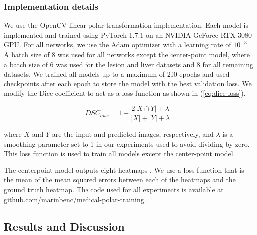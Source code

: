     \subsubsection{Implementation details}

We use the OpenCV linear polar transformation implementation.
Each model is implemented and trained using PyTorch 1.7.1 on an NVIDIA GeForce RTX 3080 GPU. For all 
networks, we use the Adam optimizer with a learning rate of $10^{-3}$. A batch size of 8 was used for all 
networks except the center-point model, where a batch size of 6 was used for the lesion and liver datasets 
and 8 for all remaining datasets. We trained all models up to a maximum of 200 epochs and used checkpoints 
after each epoch to store the model with the best validation loss. We modify the Dice coefficient to act as a loss function as shown in (\ref{eq:dice-loss}).

  \begin{equation}
    \textit{DSC}_{loss} = 1 - \frac {2\lvert X\cap Y\rvert + \lambda}{\lvert X\rvert + \lvert Y\rvert + \lambda},
    \label{eq:dice-loss}
  \end{equation}
  
where $X$ and $Y$ are the input and predicted images, respectively, and $\lambda$ is a smoothing parameter set to 1 in our experiments used to avoid dividing by zero.
This loss function is used to train all models except the center-point model.

The centerpoint model outputs eight heatmaps \cite{newellStackedHourglassNetworks2016}. 
We use a loss function that is the mean of the mean squared errors between each of the heatmaps and the ground truth heatmap.
The code used for all experiments is available at \url{github.com/marinbenc/medical-polar-training}.

  \subsection{Results and Discussion}


